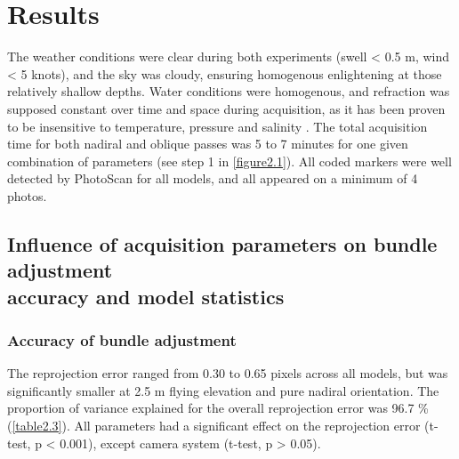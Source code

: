 \section[Results]{Results}\label{chapitre2_3}
The weather conditions were clear during both experiments (swell < 0.5 m, wind < 5 knots), and the sky was cloudy, ensuring homogenous enlightening at those relatively shallow depths. Water conditions were homogenous, and refraction was supposed constant over time and space during acquisition, as it has been proven to be insensitive to temperature, pressure and salinity \citep{moore_underwater_1976}. The total acquisition time for both nadiral and oblique passes was 5 to 7 minutes for one given combination of parameters (see step 1 in \autoref{figure2.1}). All coded markers were well detected by PhotoScan for all models, and all appeared on a minimum of 4 photos.

\subsection{Influence of acquisition parameters on bundle adjustment\\ accuracy and model statistics}\label{chapitre2_3.1}

\subsubsection{Accuracy of bundle adjustment}\label{chapitre2_3.1.1}
The reprojection error ranged from 0.30 to 0.65 pixels across all models, but was significantly smaller at 2.5 m flying elevation and pure nadiral orientation. The proportion of variance explained for the overall reprojection error was 96.7 \% (\autoref{table2.3}). All parameters had a significant effect on the reprojection error (t-test, p < 0.001), except camera system (t-test, p > 0.05). 


